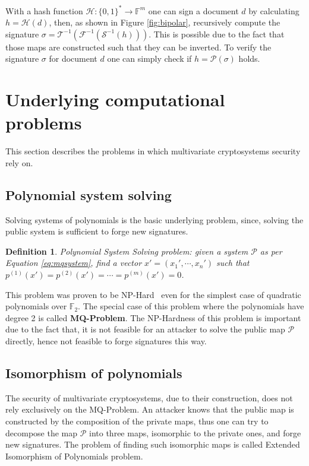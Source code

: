 \documentclass{ufsctex/ufsctex}
\newtheorem{definition}{Definition}
\begin{document}
With a hash function $\mathcal{H}:\{0,1\}^* \to \mathbb{F}^m$ one can sign a
document $d$ by calculating $h = \mathcal{H}(d)$, then, as shown in Figure
\ref{fig:bipolar}, recursively compute the signature $\sigma =
\mathcal{T}^{-1}(\mathcal{F}^{-1}(\mathcal{S}^{-1}(h)))$. This is possible due
to the fact that those maps are constructed such that they can be inverted. To
verify the signature $\sigma$ for document $d$ one can simply check if $h =
\mathcal{P}(\sigma)$ holds.

\section{Underlying computational problems}\label{sec:problems}

This section describes the problems in which multivariate cryptosystems
security rely on.

\subsection{Polynomial system solving}

Solving systems of polynomials is the basic underlying problem, since, solving
the public system is sufficient to forge new signatures.

\begin{definition}
Polynomial System Solving problem: given a system $\mathcal{P}$ as per Equation
\ref{eq:mqsystem}, find a vector $x' = (x_1',\cdots,x_n')$ such that
$p^{(1)}(x') = p^{(2)}(x') = \cdots = p^{(m)}(x') = 0$.
\end{definition}

This problem was proven to be NP-Hard~\cite[Appendix A7.2]{garey1979npc} even
for the simplest case of quadratic polynomials over $\mathbb{F}_2$. The special
case of this problem where the polynomials have degree 2 is called
\textbf{MQ-Problem}. The NP-Hardness of this problem is important due to the
fact that, it is not feasible for an attacker to solve the public map
$\mathcal{P}$ directly, hence not feasible to forge signatures this way.

\subsection{Isomorphism of polynomials}

The security of multivariate cryptosystems, due to their construction, does not
rely exclusively on the MQ-Problem. An attacker knows that the public map is
constructed by the composition of the private maps, thus one can try to
decompose the map $\mathcal{P}$ into three maps, isomorphic to the private
ones, and forge new signatures. The problem of finding such isomorphic maps is
called Extended Isomorphism of Polynomials problem.
\end{document}
